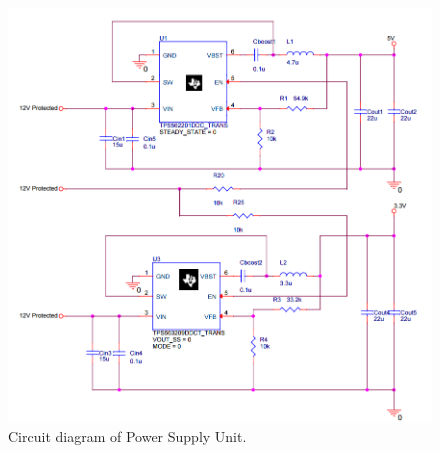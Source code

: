 \begin{figure}[H]
\begin{center}
\includegraphics[width=14cm]{Figures/psu.png}
\end{center}
\caption{Circuit diagram of Power Supply Unit.}
\label{fig:psu}
\end{figure}
